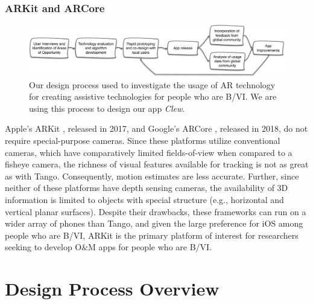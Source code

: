 \documentclass[chi_draft]{sigchi}
\newcommand{\BVI}{B/VI\xspace}
\newcommand{\OM}{O\&M\xspace}
\begin{document}
\subsubsection{ARKit and ARCore}
\begin{figure}
\includegraphics[width=\linewidth]{Figures/designprocess}
\caption{Our design process used to investigate the usage of AR technology for creating assistive technologies for people who are \BVI.  We are using this process to design our app \emph{Clew}.\label{fig:designprocess}}
\end{figure}
Apple's ARKit \cite{arkit}, released in 2017, and Google's ARCore \cite{arcore}, released in 2018, do not require special-purpose cameras.  Since these platforms utilize conventional cameras, which have comparatively limited fields-of-view when compared to a fisheye camera, the richness of visual features available for tracking is not as great as with Tango.  Consequently, motion estimates are less accurate.  Further, since neither of these platforms have depth sensing cameras, the availability of 3D information is limited to objects with special structure (e.g., horizontal and vertical planar surfaces).  Despite their drawbacks, these frameworks can run on a wider array of phones than Tango, and given the large preference for iOS among people who are \BVI \cite{morris2014blind}, ARKit is the primary platform of interest for researchers seeking to develop \OM apps for people who are \BVI.


\section{Design Process Overview}
\end{document}
